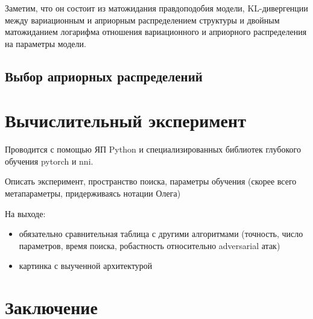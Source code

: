 \documentclass[12pt]{article}
\begin{document}
	Заметим, что он состоит из матожидания правдоподобия модели, KL-дивергенции между вариационным и априорным распределением структуры и двойным матожиданием логарифма отношения вариационного и априорного распределения на параметры модели.
	
	
	\subsection{Выбор априорных распределений}
	
	
	\newpage
	\section{Вычислительный эксперимент}
	
	Проводится с помощью ЯП Python и специализированных библиотек глубокого обучения pytorch и nni.
	
	Описать эксперимент, пространство поиска, параметры обучения (скорее всего метапараметры, придерживаясь нотации Олега)
	
	На выходе: 
	\begin{itemize}
		\item обязательно сравнительная таблица с другими алгоритмами (точность, число параметров, время поиска, робастность относительно adversarial атак)
		\item картинка с выученной архитектурой
	\end{itemize}
	
	
	
	\newpage
	\section{Заключение}
	\cite{Potapczynski2019}
	
	\newpage
	
	
	
	
\end{document}
